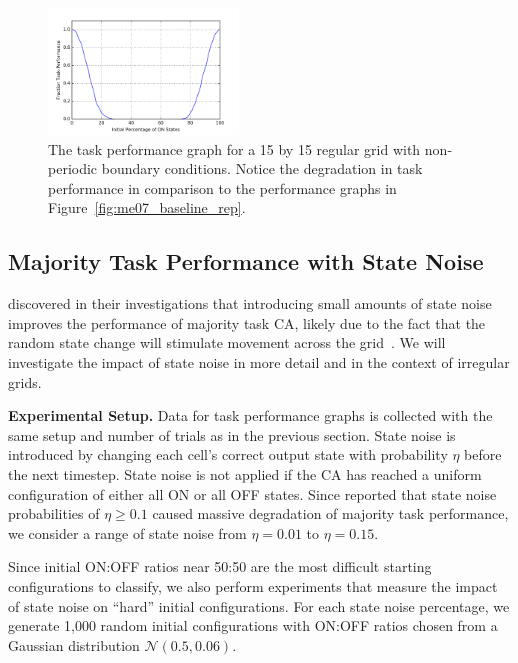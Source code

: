 \documentclass[a4paper,11pt]{article}
\begin{document}
\begin{figure}[htp]
\centering
\includegraphics[width=0.45\textwidth]{ch5_figs/lm_baseline_reg_nontor}
\caption[Local Majority Task Performance on a Non-Periodic Regular Grid]{
  The task performance graph for a 15 by 15 regular grid with non-periodic boundary conditions. Notice the degradation in task performance in comparison to the performance graphs in Figure~\ref{fig:me07_baseline_rep}.
}
\label{fig:lm_reg_nonper}
\end{figure}

\subsection{Majority Task Performance with State Noise}

\citeauthor{me07} discovered in their investigations that introducing small amounts of state noise improves the performance of majority task CA, likely due to the fact that the random state change will stimulate movement across the grid~\cite{me07}. We will investigate the impact of state noise in more detail and in the context of irregular grids.

\medskip

\noindent \textbf{Experimental Setup.} Data for task performance graphs is collected with the same setup and number of trials as in the previous section. State noise is introduced by changing each cell's correct output state with probability $\eta$ before the next timestep. State noise is not applied if the CA has reached a uniform configuration of either all ON or all OFF states. Since \citeauthor{me07} reported that state noise probabilities of $\eta \ge 0.1$ caused massive degradation of majority task performance, we consider a range of state noise from $\eta=0.01$ to $\eta=0.15$.

Since initial ON:OFF ratios near 50:50 are the most difficult starting configurations to classify, we also perform experiments that measure the impact of state noise on ``hard'' initial configurations. For each state noise percentage, we generate 1,000 random initial configurations with ON:OFF ratios chosen from a Gaussian distribution $\mathcal{N}(0.5, 0.06)$.
\end{document}
